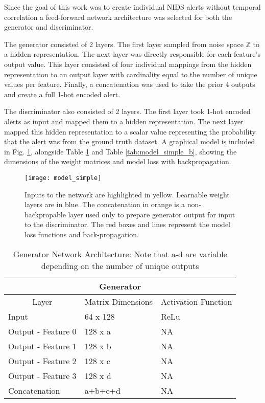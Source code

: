Since the goal of this work was to create individual NIDS alerts without temporal correlation a feed-forward network architecture was selected for both the generator and discriminator. 

The generator consisted of 2 layers. The first layer sampled from noise space $\mathbb{Z}$ to a hidden representation. The next layer was directly responsible for each feature's output value. This layer consisted of four individual mappings from the hidden representation to an output layer with cardinality equal to the number of unique values per feature. Finally, a concatenation was used to take the prior 4 outputs and create a full 1-hot encoded alert. 

The discriminator also consisted of 2 layers. The first layer took 1-hot encoded alerts as input and mapped them to a hidden representation. The next layer mapped this hidden representation to a scalar value representing the probability that the alert was from the ground truth dataset. A graphical model is included in Fig. \ref{fig:model_simple}, alongside Table \ref{tab:model_simple_a} and Table \ref{tab:model_simple_b}, showing the dimensions of the weight matrices and model loss with backpropagation.

\begin{figure}[!htbp]
	\centering%
	\texttt{[image: model\_simple]}
	\caption{
		Inputs to the network are highlighted in yellow. Learnable weight layers are in blue. The concatenation in orange is a non-backpropable layer used only to prepare generator output for input to the discriminator. The red boxes and lines represent the model loss functions and back-propagation.
	}
	\label{fig:model_simple}
\end{figure}


\begin{table}[!htbp]
	\centering
	\label{tab:model_simple_a}
	\caption{Generator Network Architecture: Note that a-d are variable depending on the number of unique outputs}
	\begin{tabular}{l|l|l}
		\hline
		\multicolumn{3}{c}{\textbf{Generator}} \\ 
		\hline
		\multicolumn{1}{c|}{Layer} & \multicolumn{1}{c|}{Matrix Dimensions} & \multicolumn{1}{c}{Activation Function} \\ \hline
		Input & 64 x 128 & ReLu \\
		Output - Feature 0 & 128 x a & NA \\
		Output - Feature 1 & 128 x b & NA \\
		Output - Feature 2 & 128 x c & NA \\
		Output  - Feature 3 & 128 x d & NA \\
		Concatenation & a+b+c+d & NA \\
		\hline
	\end{tabular}
\end{table}

